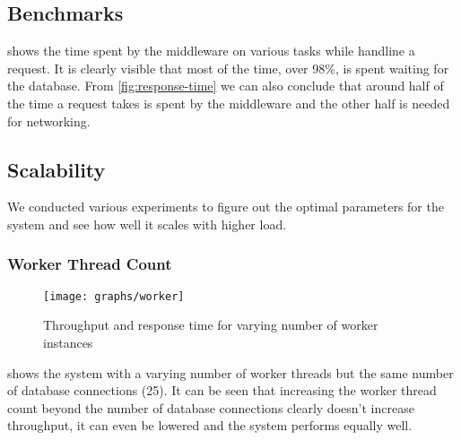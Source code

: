 \documentclass[a4paper, oneside]{csthesis}
\begin{document}
\subsection{Benchmarks}
	\begin{table}[hp]
        \centering
        \caption{Time spent on various tasks by middleware workers}
        \label{tbl:benchmark}
    \end{table}
    
     shows the time spent by the middleware on various tasks while handline a
    request. It is clearly visible that most of the time, over 98\%, is spent waiting for the database.
    From \cref{fig:response-time} we can also conclude that around half of the time a request takes is
    spent by the middleware and the other half is needed for networking.

\newpage
\subsection{Scalability}
	We conducted various experiments to figure out the optimal parameters for the system and see how
	well it scales with higher load.

\subsubsection{Worker Thread Count}
    \begin{figure}[ht]
    \centering
        \texttt{[image: graphs/worker]}
        \caption{Throughput and response time for varying number of worker instances}
        \label{fig:worker}
    \end{figure}
    
     shows the system with a varying number of worker threads but the same
    number of database connections (25). It can be seen that increasing the worker thread count beyond
    the number of database connections clearly doesn't increase throughput, it can even be lowered and
    the system performs equally well.
\end{document}
